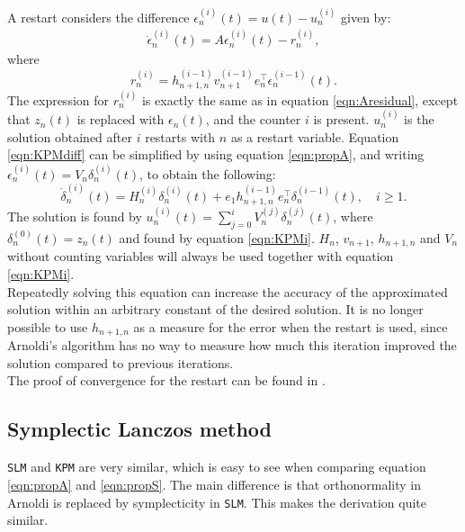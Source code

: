 \noindent A restart considers the difference $\epsilon_n^{(i)}(t) = u(t)-u_n^{(i)}$ given by:
\begin{equation}
\begin{aligned}
\dot{\epsilon}_n^{(i)}(t)=A \epsilon_n^{(i)} (t)  - r_n^{(i)},
\end{aligned}
\label{eqn:KPMdiff}
\end{equation}
where 
\begin{equation*}
r_n^{(i)} = h_{n+1,n}^{(i-1)} v_{n+1}^{(i-1)} e_n^{\top} \epsilon_n^{(i-1)} (t).
\end{equation*}
\noindent The expression for $r_n^{(i)}$ is exactly the same as in equation \eqref{eqn:Aresidual}, except that $z_n(t)$ is replaced with $\epsilon_n(t)$, and the counter $i$ is present. $u_n^{(i)}$ is the solution obtained after $i$ restarts with $n$ as a restart variable. 
\noindent Equation \eqref{eqn:KPMdiff} can be simplified by using equation \eqref{eqn:propA}, and writing $ \epsilon^{(i)}_n(t)  = V_n \delta_n^{(i)}(t) $, to obtain the following:
\begin{equation}
\dot{\delta}^{(i)}_n(t) = H_n^{(i)} \delta_n^{(i)}(t) + e_1 h_{n+1,n}^{(i-1)} e^\top_n \delta_n^{(i-1)}(t), \quad i \geq 1.
\label{eqn:KPMr}
\end{equation}
\noindent The solution is found by $ u_n^{(i)}(t) = \sum \limits_{j = 0} ^i V_n^{(j)} \delta_n^{(j)} (t) $, where $\delta_n^{(0)} (t) = z_n(t)$ and found by equation \eqref{eqn:KPMi}. $H_n$, $v_{n+1}$, $h_{n+1,n}$ and $V_n$ without counting variables will always be used together with equation \eqref{eqn:KPMi}. \\
Repeatedly solving this equation can increase the accuracy of the approximated solution within an arbitrary constant of the desired solution. It is no longer possible to use $h_{n+1,n}$ as a measure for the error when the restart is used, since Arnoldi's algorithm has no way to measure how much this iteration improved the solution compared to previous iterations.\\

\noindent The proof of convergence for the restart can be found in \cite{elenaconv}.\\
\subsection{Symplectic Lanczos method}
\texttt{SLM} and \texttt{KPM} are very similar, which is easy to see when comparing equation \eqref{eqn:propA} and \eqref{eqn:propS}. The main difference is that orthonormality in Arnoldi is replaced by symplecticity in \texttt{SLM}. This makes the derivation quite similar.\\

